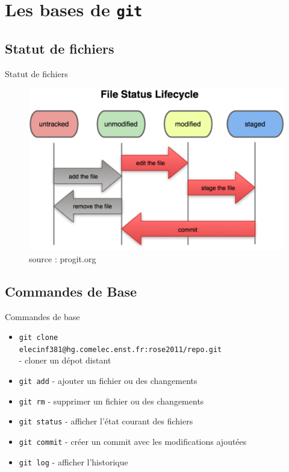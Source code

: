 \documentclass{beamer}
\newcommand{\git}{\texttt{git}\xspace}
\begin{document}
\section{Les bases de \git}
\subsection*{Statut de fichiers}
\begin{frame}{Statut de fichiers}
  \begin{figure}
    \begin{center}
      \includegraphics[scale=0.7]{img/Status_lifecycle.png}
    \end{center}
    \caption{source : progit.org}
  \end{figure}
\end{frame}

\subsection*{Commandes de Base}
\begin{frame}[containsverbatim]{Commandes de base}
  \begin{itemize}
  \item \lstinline|git clone| \\
    \lstinline|elecinf381@hg.comelec.enst.fr:rose2011/repo.git| \\
    - cloner un dépot distant
  \item \lstinline|git add| - ajouter un fichier ou des changements
  \item \lstinline|git rm| - supprimer un fichier ou des changements
  \item \lstinline|git status| - afficher l'état courant des fichiers
  \item \lstinline|git commit| - créer un commit avec les modifications ajoutées
  \item \lstinline|git log| - afficher l'historique
  \end{itemize}
\end{frame}
\end{document}
